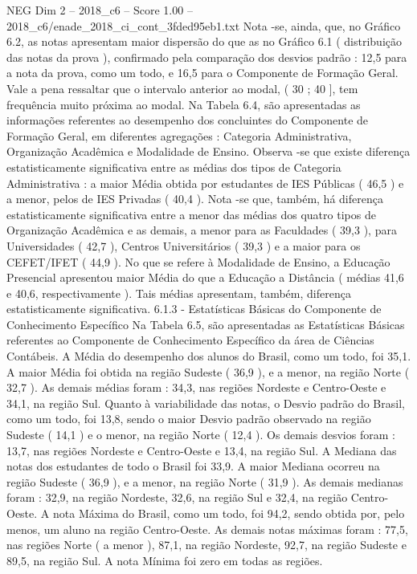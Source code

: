 \begin{textsample}{NEG Dim 2 – 2018\_c6 – Score 1.00 – 2018\_c6/enade\_2018\_ci\_cont\_3fded95eb1.txt}
Nota -se, ainda, que, no Gráfico 6.2, as notas apresentam maior dispersão do que as no Gráfico 6.1 ( distribuição das notas da prova ), confirmado pela comparação dos desvios padrão : 12,5 para a nota da prova, como um todo, e 16,5 para o Componente de Formação Geral.
Vale a pena ressaltar que o intervalo anterior ao modal, ( 30 ; 40 ], tem frequência muito próxima ao modal.
Na Tabela 6.4, são apresentadas as informações referentes ao desempenho dos concluintes do Componente de Formação Geral, em diferentes agregações : Categoria Administrativa, Organização Acadêmica e Modalidade de Ensino.
Observa -se que existe diferença estatisticamente significativa entre as médias dos tipos de Categoria Administrativa : a maior Média obtida por estudantes de IES Públicas ( 46,5 ) e a menor, pelos de IES Privadas ( 40,4 ).
Nota -se que, também, há diferença estatisticamente significativa entre a menor das médias dos quatro tipos de Organização Acadêmica e as demais, a menor para as Faculdades ( 39,3 ), para Universidades ( 42,7 ), Centros Universitários ( 39,3 ) e a maior para os CEFET/IFET ( 44,9 ).
No que se refere à Modalidade de Ensino, a Educação Presencial apresentou maior Média do que a Educação a Distância ( médias 41,6 e 40,6, respectivamente ).
Tais médias apresentam, também, diferença estatisticamente significativa. 6.1.3 - Estatísticas Básicas do Componente de Conhecimento Específico Na Tabela 6.5, são apresentadas as Estatísticas Básicas referentes ao Componente de Conhecimento Específico da área de Ciências Contábeis.
A Média do desempenho dos alunos do Brasil, como um todo, foi 35,1.
A maior Média foi obtida na região Sudeste ( 36,9 ), e a menor, na região Norte ( 32,7 ).
As demais médias foram : 34,3, nas regiões Nordeste e Centro-Oeste e 34,1, na região Sul.
Quanto à variabilidade das notas, o Desvio padrão do Brasil, como um todo, foi 13,8, sendo o maior Desvio padrão observado na região Sudeste ( 14,1 ) e o menor, na região Norte ( 12,4 ).
Os demais desvios foram : 13,7, nas regiões Nordeste e Centro-Oeste e 13,4, na região Sul.
A Mediana das notas dos estudantes de todo o Brasil foi 33,9.
A maior Mediana ocorreu na região Sudeste ( 36,9 ), e a menor, na região Norte ( 31,9 ).
As demais medianas foram : 32,9, na região Nordeste, 32,6, na região Sul e 32,4, na região Centro-Oeste.
A nota Máxima do Brasil, como um todo, foi 94,2, sendo obtida por, pelo menos, um aluno na região Centro-Oeste.
As demais notas máximas foram : 77,5, nas regiões Norte ( a menor ), 87,1, na região Nordeste, 92,7, na região Sudeste e 89,5, na região Sul.
A nota Mínima foi zero em todas as regiões.

\end{textsample}
